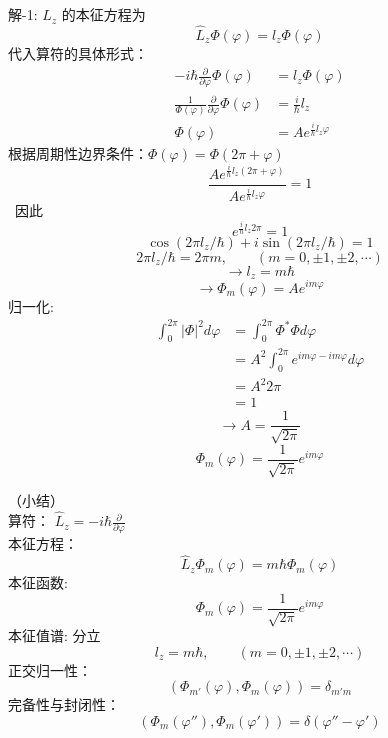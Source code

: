 \begin{frame} [allowframebreaks=]
    \alert{解-1:} $\hat{L}_z$ 的本征方程为 
    $$\hat{L}_z\Phi(\varphi)=l_z\Phi(\varphi)$$
    代入算符的具体形式：
    \begin{equation*}
        \begin{split}
            -i \hbar \frac{\partial}{\partial \varphi}\Phi(\varphi)&=l_z\Phi(\varphi) \\
            \frac{1}{\Phi(\varphi)}\frac{\partial}{\partial \varphi}\Phi(\varphi)&=\frac{i}{\hbar}l_z \\
            \Phi(\varphi)&=A e ^{\frac{i}{\hbar}l_z\varphi}
        \end{split} 
    \end{equation*}
     根据周期性边界条件：$\Phi(\varphi)=\Phi(2\pi+\varphi)$\\
    \begin{equation*}
        \frac{A e ^{\frac{i}{\hbar}l_z(2\pi+\varphi)}}{A e ^{\frac{i}{\hbar}l_z\varphi}}=1
    \end{equation*} 
     因此
    \begin{equation*}
        e ^{\frac{i}{\hbar}l_z2\pi}=1
    \end{equation*} 
    $$
    \cos \left(2 \pi l_{z} / \hbar\right)+i \sin \left(2 \pi l_{z} / \hbar\right)=1
    $$
    $$ 2 \pi l_{z} / \hbar=2\pi m, \qquad (m=0,\pm 1,  \pm 2, \cdots) $$
    $$\to l_z=m\hbar$$
    $$\to \Phi_m(\varphi)=Ae^{im\varphi}$$
    归一化:
    \begin{equation*}
        \begin{split}
            \int_0 ^{2\pi} |\Phi|^2 d \varphi &= \int_0 ^{2\pi} \Phi^*\Phi  d \varphi \\
            &= A^2 \int_0 ^{2\pi} e^{im\varphi-im\varphi} d \varphi \\
            &= A^2 2\pi \\
            &= 1
        \end{split}   
    \end{equation*}
    $$ \to A= \frac{1}{\sqrt{2\pi}} $$
    $$ \Phi_m(\varphi)=\frac{1}{\sqrt{2\pi}}e^{im\varphi}$$
\end{frame} 

\begin{frame} 
    （小结）\\
    算符：  $\hat{L}_{z}=-i \hbar \frac{\partial}{\partial \varphi}$ \\
    本征方程： $$\hat{L}_z\Phi_m(\varphi)=m\hbar \Phi_m (\varphi)$$
    本征函数: $$ \Phi_m(\varphi)=\frac{1}{\sqrt{2\pi}}e^{im\varphi}$$
    本征值谱:  分立
        $$ l_z=m\hbar, \qquad (m=0,\pm 1,  \pm 2, \cdots) $$
    正交归一性：
        $$ (\Phi_{m'}(\varphi), \Phi_m(\varphi)) =\delta_{m'm}$$
    完备性与封闭性：$$ (\Phi_m(\varphi''), \Phi_m(\varphi')) =\delta(\varphi''-\varphi')$$
\end{frame} 

